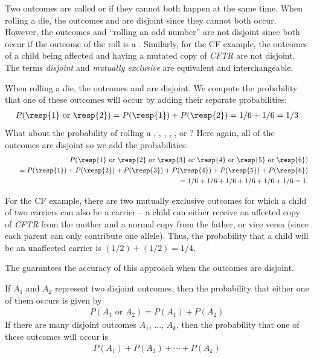 Two outcomes are called  or  if they cannot both happen at the same time. When rolling a die, the outcomes  and  are disjoint since they cannot both occur.  However, the outcomes  and ``rolling an odd number'' are not disjoint since both occur if the outcome of the roll is a . Similarly, for the CF example, the outcomes of a child being affected and having a mutated copy of \textit{CFTR} are not disjoint. The terms \emph{disjoint} and \emph{mutually exclusive} are equivalent and interchangeable. 

When rolling a die, the outcomes  and  are disjoint. We compute the probability that one of these outcomes will occur by adding their separate probabilities:
\begin{eqnarray*}
P(\text{\resp{1} or \resp{2}}) = P(\text{\resp{1}})+P(\text{\resp{2}}) = 1/6 + 1/6 = 1/3
\end{eqnarray*}
What about  the probability of rolling a , , , , , or ? Here again, all of the outcomes are disjoint so we add the probabilities:
\begin{eqnarray*}
&&P(\text{\resp{1} or \resp{2} or \resp{3} or \resp{4} or \resp{5} or \resp{6}}) \\
	&&\quad= P(\text{\resp{1}})+P(\text{\resp{2}})+P(\text{\resp{3}})+P(\text{\resp{4}})+P(\text{\resp{5}})+P(\text{\resp{6}}) \\
	&&\quad= 1/6 + 1/6 + 1/6 + 1/6 + 1/6 + 1/6 = 1.
\end{eqnarray*}

For the CF example, there are two mutually exclusive outcomes for which a child of two carriers can also be a carrier -- a child can either receive an affected copy of \textit{CFTR} from the mother and a normal copy from the father, or vice versa (since each parent can only contribute one allele). Thus, the probability that a child will be an unaffected carrier is $(1/2) + (1/2) = 1/4$.

The  guarantees the accuracy of this approach when the outcomes are disjoint. 

\begin{termBox}{ If $A_1$ and $A_2$ represent two disjoint outcomes, then the probability that either one of them occurs is given by
\begin{eqnarray*}
P(A_1\text{ or } A_2) = P(A_1) + P(A_2)
\end{eqnarray*}
If there are many disjoint outcomes $A_1$, ..., $A_k$, then the probability that one of these outcomes will occur is
\begin{eqnarray}
P(A_1) + P(A_2) + \cdots + P(A_k)
\end{eqnarray}
}
\end{termBox}

